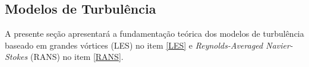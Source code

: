 \subsection{Modelos de Turbulência} \label{MdT}

A presente seção apresentará a fundamentação teórica dos modelos de turbulência baseado em grandes vórtices (LES) no item \ref{LES} e \textit{Reynolds-Averaged Navier-Stokes} (RANS) no item \ref{RANS}.

%


%